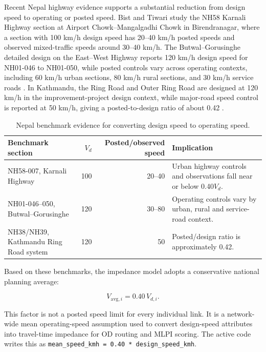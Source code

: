 \documentclass[11pt,a4paper]{article}
\begin{document}
Recent Nepal highway evidence supports a substantial reduction from design
speed to operating or posted speed. Bist and Tiwari \cite{bist2024} study the
NH58 Karnali Highway section at Airport Chowk--Mangalgadhi Chowk in
Birendranagar, where a section with 100 km/h design speed has 20--40 km/h
posted speeds and observed mixed-traffic speeds around 30--40 km/h. The
Butwal--Gorusinghe detailed design on the East--West Highway reports 120 km/h
design speed for NH01-046 to NH01-050, while posted controls vary across
operating contexts, including 60 km/h urban sections, 80 km/h rural sections,
and 30 km/h service roads \cite{dor2023}. In Kathmandu, the Ring Road and Outer
Ring Road are designed at 120 km/h in the improvement-project design context,
while major-road speed control is reported at 50 km/h, giving a posted-to-design
ratio of about 0.42 \cite{jica2022,ktmtraffic2023}.

\begin{table}[H]
\centering
\caption{Nepal benchmark evidence for converting design speed to operating speed.}
\small
\begin{tabularx}{\linewidth}{lrrl}
\toprule
\textbf{Benchmark section} & \textbf{$V_d$} & \textbf{Posted/observed speed} &
\textbf{Implication} \\
\midrule
NH58-007, Karnali Highway & 100 & 20--40 &
Urban highway controls and observations fall near or below 0.40$V_d$. \\
NH01-046--050, Butwal--Gorusinghe & 120 & 30--80 &
Operating controls vary by urban, rural and service-road context. \\
NH38/NH39, Kathmandu Ring Road system & 120 & 50 &
Posted/design ratio is approximately 0.42. \\
\bottomrule
\end{tabularx}
\end{table}

Based on these benchmarks, the impedance model adopts a conservative national
planning average:

\begin{equation}
V_{\text{avg},i}=0.40\,V_{d,i}.
\label{eq:mean-speed}
\end{equation}

This factor is not a posted speed limit for every individual link. It is a
network-wide mean operating-speed assumption used to convert design-speed
attributes into travel-time impedance for OD routing and MLPI scoring. The
active code writes this as
\texttt{mean\_speed\_kmh = 0.40 * design\_speed\_kmh}.
\end{document}
